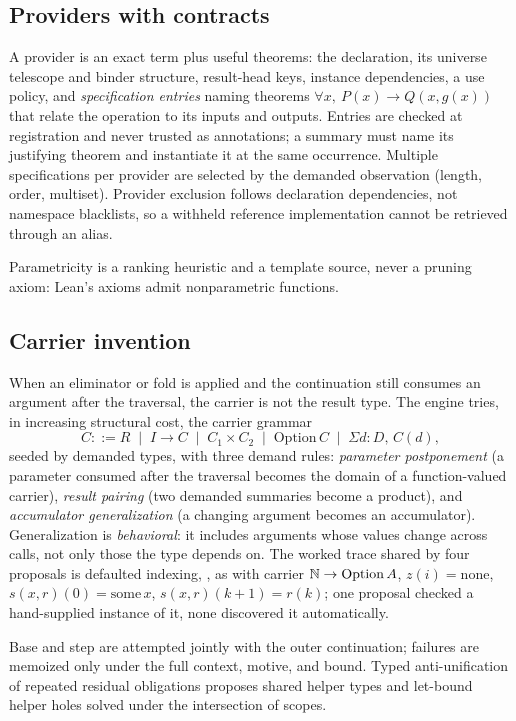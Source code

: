 \subsection{Providers with contracts}

A provider is an exact term plus useful theorems: the declaration, its universe telescope and binder structure, result-head keys, instance dependencies, a use policy, and \emph{specification entries} naming theorems $\forall x,\ P(x) \to Q(x, g(x))$ that relate the operation to its inputs and outputs. Entries are checked at registration and never trusted as annotations; a summary must name its justifying theorem and instantiate it at the same occurrence. Multiple specifications per provider are selected by the demanded observation (length, order, multiset). Provider exclusion follows declaration dependencies, not namespace blacklists, so a withheld reference implementation cannot be retrieved through an alias.

Parametricity is a ranking heuristic and a template source, never a pruning axiom: Lean's axioms admit nonparametric functions.

\subsection{Carrier invention}\label{sec:carriers}

When an eliminator or fold is applied and the continuation still consumes an argument after the traversal, the carrier is not the result type. The engine tries, in increasing structural cost, the carrier grammar
\[
C ::= R \;\mid\; I \to C \;\mid\; C_1 \times C_2 \;\mid\; \mathrm{Option}\,C \;\mid\; \Sigma d{:}D,\, C(d),
\]
seeded by demanded types, with three demand rules: \emph{parameter postponement} (a parameter consumed after the traversal becomes the domain of a function-valued carrier), \emph{result pairing} (two demanded summaries become a product), and \emph{accumulator generalization} (a changing argument becomes an accumulator). Generalization is \emph{behavioral}: it includes arguments whose values change across calls, not only those the type depends on. The worked trace shared by four proposals is defaulted indexing, , as  with carrier $\mathbb{N} \to \mathrm{Option}\,A$, $z(i) = \mathrm{none}$, $s(x,r)(0) = \mathrm{some}\,x$, $s(x,r)(k+1) = r(k)$; one proposal checked a hand-supplied instance of it, none discovered it automatically.

Base and step are attempted jointly with the outer continuation; failures are memoized only under the full context, motive, and bound. Typed anti-unification of repeated residual obligations proposes shared helper types and let-bound helper holes solved under the intersection of scopes.
